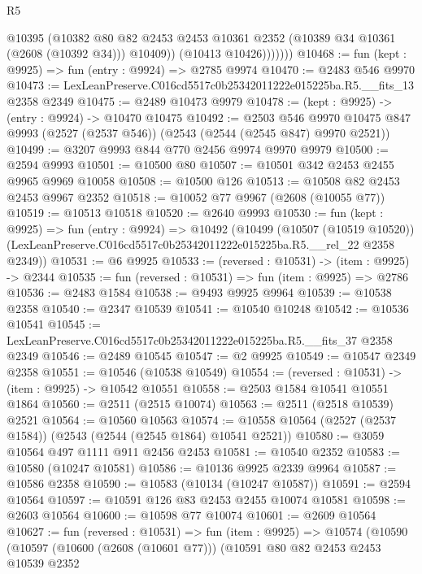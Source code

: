 \begin{lexlean}{R5}
\begin{coremodule}
                  @10395
                  (@10382
                    @80
                    @82
                    @2453
                    @2453
                    @10361
                    @2352
                    (@10389 @34 @10361 (@2608 (@10392 @34)))
                    @10409))
                (@10413 @10426)))))))
@10468 := fun (kept : @9925) => fun (entry : @9924) => @2785 @9974
@10470 := @2483 @546 @9970
@10473 := LexLeanPreserve.C016cd5517c0b25342011222e015225ba.R5.__fits_13 @2358 @2349
@10475 := @2489 @10473 @9979
@10478 := (kept : @9925) -> (entry : @9924) -> @10470 @10475
@10492 := @2503
    @546
    @9970
    @10475
    @847
    @9993
    (@2527 (@2537 @546))
    (@2543 (@2544 (@2545 @847) @9970 @2521))
@10499 := @3207 @9993 @844 @770 @2456 @9974 @9970 @9979
@10500 := @2594 @9993
@10501 := @10500 @80
@10507 := @10501 @342 @2453 @2455 @9965 @9969 @10058
@10508 := @10500 @126
@10513 := @10508 @82 @2453 @2453 @9967 @2352
@10518 := @10052 @77 @9967 (@2608 (@10055 @77))
@10519 := @10513 @10518
@10520 := @2640 @9993
@10530 := fun (kept : @9925) =>
  fun (entry : @9924) =>
  @10492
    (@10499
      (@10507 (@10519 @10520))
      (LexLeanPreserve.C016cd5517c0b25342011222e015225ba.R5.__rel_22 @2358 @2349))
@10531 := @6 @9925
@10533 := (reversed : @10531) -> (item : @9925) -> @2344
@10535 := fun (reversed : @10531) => fun (item : @9925) => @2786
@10536 := @2483 @1584
@10538 := @9493 @9925 @9964
@10539 := @10538 @2358
@10540 := @2347 @10539
@10541 := @10540 @10248
@10542 := @10536 @10541
@10545 := LexLeanPreserve.C016cd5517c0b25342011222e015225ba.R5.__fits_37 @2358 @2349
@10546 := @2489 @10545
@10547 := @2 @9925
@10549 := @10547 @2349 @2358
@10551 := @10546 (@10538 @10549)
@10554 := (reversed : @10531) -> (item : @9925) -> @10542 @10551
@10558 := @2503 @1584 @10541 @10551 @1864
@10560 := @2511 (@2515 @10074)
@10563 := @2511 (@2518 @10539) @2521
@10564 := @10560 @10563
@10574 := @10558 @10564 (@2527 (@2537 @1584)) (@2543 (@2544 (@2545 @1864) @10541 @2521))
@10580 := @3059 @10564 @497 @1111 @911 @2456 @2453
@10581 := @10540 @2352
@10583 := @10580 (@10247 @10581)
@10586 := @10136 @9925 @2339 @9964
@10587 := @10586 @2358
@10590 := @10583 (@10134 (@10247 @10587))
@10591 := @2594 @10564
@10597 := @10591 @126 @83 @2453 @2455 @10074 @10581
@10598 := @2603 @10564
@10600 := @10598 @77 @10074
@10601 := @2609 @10564
@10627 := fun (reversed : @10531) =>
  fun (item : @9925) =>
  @10574
    (@10590
      (@10597
        (@10600 (@2608 (@10601 @77)))
        (@10591
          @80
          @82
          @2453
          @2453
          @10539
          @2352

\end{coremodule}
\end{lexlean}
